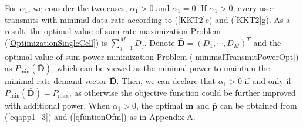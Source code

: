 \documentclass[journal]{IEEEtran}
\begin{document}
For $\alpha_1$, we consider the two cases, $\alpha_1>0$ and $\alpha_1=0$.
If $\alpha_1>0$, every user transmits with minimal data rate according to (\ref{KKT2}c) and (\ref{KKT2}g).
As a result, the optimal value of sum rate maximization Problem (\ref{OptimizationSingleCell}) is $\sum_{j=1}^M D_j$.
Denote $\pmb {\bar D}=(D_1, \cdots, D_M)^T$ and the optimal value of sum power minimization Problem (\ref{minimalTransmitPowerOpt}) as $P_{\min}(\pmb {\bar D})$, which can be viewed as the minimal power to maintain the minimal rate demand vector $\pmb {\bar D}$.
Then, we can declare that $\alpha_1>0$ if and only if $P_{\min}(\pmb {\bar D})=P_{\max}$, as otherwise the objective function could be further improved with additional power.
When $\alpha_1>0$, the optimal $\pmb {\tilde m }$ and $\pmb {\bar p}$ can be obtained from (\ref{eqapp1_3}) and (\ref{qfuntionOfm}) as in Appendix A.
\end{document}
